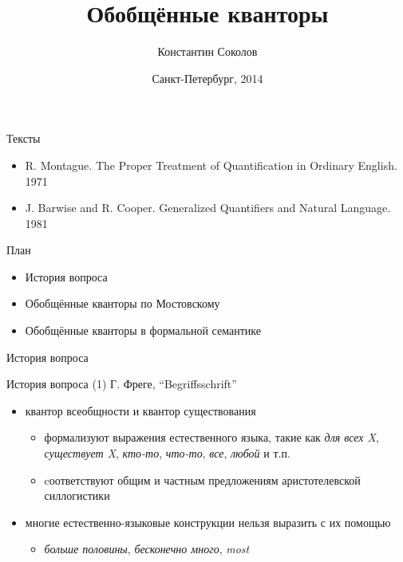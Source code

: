 \documentclass{beamer}
\begin{document}
\title{\Large{Обобщённые кванторы}}
\author{Константин Соколов}
\date{Санкт-Петербург, 2014} 
\begin{frame}
    \thispagestyle{empty}
    \titlepage
\end{frame}

\begin{frame}{Тексты}
\setcounter{framenumber}{1}
\begin{itemize}
    \item R. Montague. The Proper Treatment of Quantification in Ordinary English. 1971
	\item J. Barwise and R. Cooper. Generalized Quantifiers and Natural Language. 1981
\end{itemize}
\end{frame}

\begin{frame}{План}
\begin{itemize}
    \item История вопроса
	\item Обобщённые кванторы по Мостовскому
	\item Обобщённые кванторы в формальной семантике
\end{itemize}
\end{frame}

\begin{frame}{}
\begin{center}
История вопроса
\end{center}
\end{frame}

\begin{frame}{История вопроса (1)}
Г. Фреге, ``Begriffsschrift''
\bigskip
\begin{itemize}
	\item квантор всеобщности и квантор существования 
	    \medskip
	    \begin{itemize}
	        \item формализуют выражения естественного языка, такие как \textit{для всех X}, \textit{существует X}, \textit{кто-то}, \textit{что-то}, \textit{все}, \textit{любой} и т.п.
	        \medskip
        	\item cоответствуют общим и частным предложениям аристотелевской силлогистики
        \end{itemize}
    \bigskip
    \item многие естественно-языковые конструкции нельзя выразить с их помощью
        \medskip
        \begin{itemize}
            \item \textit{больше половины}, \textit{бесконечно много}, \textit{most}
        \end{itemize}
\end{itemize}
\end{frame}
\end{document}
